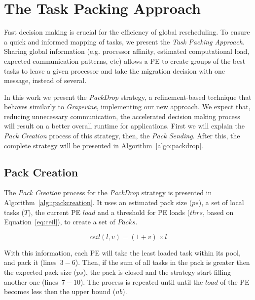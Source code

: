 \section{The Task Packing Approach}

Fast decision making is crucial for the efficiency of global rescheduling.
To ensure a quick and informed mapping of tasks, we present the \textit{Task Packing Approach}.
Sharing global information (e.g. processor affinity, estimated computational load, expected communication patterns, etc) allows a PE to create groups of the best tasks to leave a given processor and take the migration decision with one message, instead of several.

In this work we present the \textit{PackDrop} strategy, a refinement-based technique that behaves similarly to \textit{Grapevine}, implementing our new approach.
We expect that, reducing unnecessary communication, the accelerated decision making process will result on a better overall runtime for applications.
First we will explain the \textit{Pack Creation} process of this strategy, then, the \textit{Pack Sending}.
After this, the complete strategy will be presented in Algorithm~\ref{algo:packdrop}.

\subsection{Pack Creation}

The \textit{Pack Creation} process for the \textit{PackDrop} strategy is presented in Algorithm~\ref{alg::packcreation}.
It uses an estimated pack size ($ps$), a set of local tasks ($  T$), the current PE $load$ and a threshold for PE loads ($thrs$, based on Equation~\ref{eq:ceil}), to create a set of $Packs$.

\begin{equation}
	ceil(l,v) = (1+v)\times l
    \label{eq:ceil}
\end{equation}

With this information, each PE will take the least loaded task within its pool, and pack it (lines~$3-6$).
Then, if the sum of all tasks in the pack is greater then the expected pack size ($ps$), the pack is closed and the strategy start filling another one (lines~$7-10$).
The process is repeated until until the $load$ of the PE becomes less then the upper bound ($ub$).

